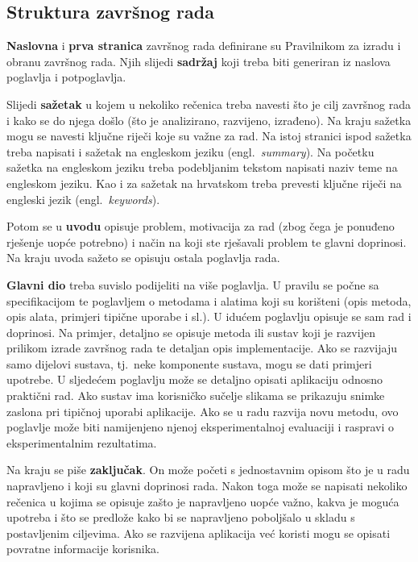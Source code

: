 \subsection{Struktura završnog rada}
\textbf{Naslovna} i \textbf{prva stranica} završnog rada definirane su Pravilnikom za izradu i obranu završnog rada. Njih slijedi \textbf{sadržaj} koji treba biti generiran iz naslova poglavlja i potpoglavlja.

Slijedi \textbf{sažetak} u kojem u nekoliko rečenica treba navesti što je cilj završnog rada i kako se do njega došlo (što je analizirano, razvijeno, izrađeno). Na kraju sažetka mogu se navesti ključne riječi koje su važne za rad. Na istoj stranici ispod sažetka treba napisati i sažetak na engleskom jeziku (engl.~\textit{summary}). Na početku sažetka na engleskom jeziku treba podebljanim tekstom napisati naziv teme na engleskom jeziku. Kao i za sažetak na hrvatskom treba prevesti ključne riječi na engleski jezik (engl.~\textit{keywords}).

Potom se u \textbf{uvodu} opisuje problem, motivacija za rad (zbog čega je ponuđeno rješenje uopće potrebno) i način na koji ste rješavali problem te glavni doprinosi. Na kraju uvoda sažeto se opisuju ostala poglavlja rada.

\textbf{Glavni dio} treba suvislo podijeliti na više poglavlja. U pravilu se počne sa specifikacijom te poglavljem o metodama i alatima koji su korišteni (opis metoda, opis alata, primjeri tipične uporabe i sl.). U idućem poglavlju opisuje se sam rad i doprinosi. Na primjer, detaljno se opisuje metoda ili sustav koji je razvijen prilikom izrade završnog rada te detaljan opis implementacije. Ako se razvijaju samo dijelovi sustava, tj.~neke komponente sustava, mogu se dati primjeri upotrebe. U sljedećem poglavlju može se detaljno opisati aplikaciju odnosno praktični rad. Ako sustav ima korisničko sučelje slikama se prikazuju snimke zaslona pri tipičnoj uporabi aplikacije. Ako se u radu razvija novu metodu, ovo poglavlje može biti namijenjeno njenoj eksperimentalnoj evaluaciji i raspravi o eksperimentalnim rezultatima.

Na kraju se piše \textbf{zaključak}. On može početi s jednostavnim opisom što je u radu napravljeno i koji su glavni doprinosi rada. Nakon toga može se napisati nekoliko rečenica u kojima se opisuje zašto je napravljeno uopće važno, kakva je moguća upotreba i što se predlože kako bi se napravljeno poboljšalo u skladu s postavljenim ciljevima. Ako se razvijena aplikacija već koristi mogu se opisati povratne informacije korisnika.

